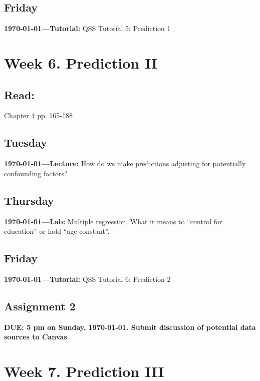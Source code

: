 \AdvanceDate[1]
\subsection{Friday} \textbf{\today---Tutorial:} QSS Tutorial 5: Prediction 1
\AdvanceDate[4]




\vspace{2em}

\section{Week 6. Prediction II}


\subsection{Read:}

\citet{Imai2022-pm} Chapter 4 pp. 165-188


\subsection{Tuesday} \textbf{\today---Lecture:} How do we make predictions adjusting for potentially confounding factors? 

\AdvanceDate[2]

\subsection{Thursday} \textbf{\today---Lab:} Multiple regression. What it means to ``control for education'' or hold ``age constant''. 

\AdvanceDate[1]
\subsection{Friday} \textbf{\today---Tutorial:} QSS Tutorial 6: Prediction 2
\AdvanceDate[2]

\vspace{2em}

\subsection{Assignment 2} \textbf{DUE: 5 pm on Sunday, \today. Submit discussion of potential data sources to Canvas}

\AdvanceDate[2]

\vspace{2em}


\section{Week 7. Prediction III}

